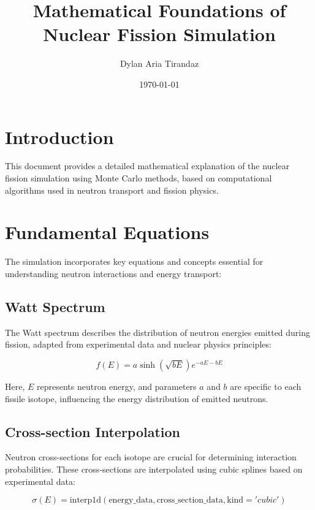 \documentclass{article}
\begin{document}
\title{Mathematical Foundations of Nuclear Fission Simulation}
\author{Dylan Aria Tirandaz}
\date{\today}
\maketitle

\section{Introduction}

This document provides a detailed mathematical explanation of the nuclear fission simulation using Monte Carlo methods, based on computational algorithms used in neutron transport and fission physics.

\section{Fundamental Equations}

The simulation incorporates key equations and concepts essential for understanding neutron interactions and energy transport:

\subsection{Watt Spectrum}

The Watt spectrum describes the distribution of neutron energies emitted during fission, adapted from experimental data and nuclear physics principles:

\begin{equation}
f(E) = a \sinh\left(\sqrt{bE}\right) e^{-aE - bE}
\end{equation}

Here, \( E \) represents neutron energy, and parameters \( a \) and \( b \) are specific to each fissile isotope, influencing the energy distribution of emitted neutrons.

\subsection{Cross-section Interpolation}

Neutron cross-sections for each isotope are crucial for determining interaction probabilities. These cross-sections are interpolated using cubic splines based on experimental data:

\begin{equation}
\sigma(E) = \text{interp1d}(\text{energy\_data}, \text{cross\_section\_data}, \text{kind}='cubic')
\end{equation}
\end{document}

